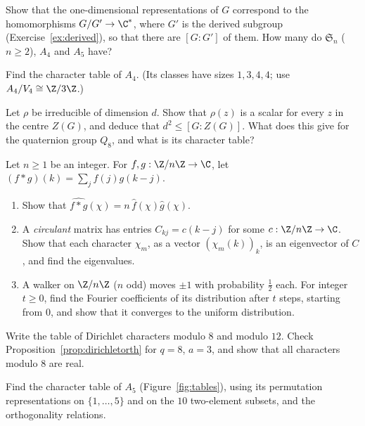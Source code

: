 \begin{exercise}[$\star$]\label{ex:onedim}
Show that the one-dimensional representations of $G$ correspond to the homomorphisms $G/G'\to\C^*$, where $G'$ is the derived subgroup (Exercise~\ref{ex:derived}), so that there are $[G:G']$ of them. How many do $\mathfrak S_n$ ($n\ge2$), $A_4$ and $A_5$ have?
\end{exercise}

\begin{exercise}[$\star\star$]\label{ex:a4}
Find the character table of $A_4$. (Its classes have sizes $1,3,4,4$; use $A_4/V_4\cong\Z/3\Z$.)
\end{exercise}

\begin{exercise}[$\star\star$]\label{ex:centralchar}
Let $\rho$ be irreducible of dimension $d$. Show that $\rho(z)$ is a scalar for every $z$ in the centre $Z(G)$, and deduce that $d^2\le[G:Z(G)]$. What does this give for the quaternion group $Q_8$, and what is its character table?
\end{exercise}

\begin{exercise}[$\star\star$]\label{ex:circulant}
Let $n\ge1$ be an integer. For $f,g:\Z/n\Z\to\C$, let $(f*g)(k)=\sum_jf(j)g(k-j)$.
\begin{enumerate}[label=(\alph*)]
\item Show that $\widehat{f*g}(\chi)=n\,\hat f(\chi)\hat g(\chi)$.
\item A \emph{circulant} matrix has entries $C_{kj}=c(k-j)$ for some $c:\Z/n\Z\to\C$. Show that each character $\chi_m$, as a vector $(\chi_m(k))_k$, is an eigenvector of $C$, and find the eigenvalues.
\item A walker on $\Z/n\Z$ ($n$ odd) moves $\pm1$ with probability $\frac12$ each. For integer $t\ge0$, find the Fourier coefficients of its distribution after $t$ steps, starting from $0$, and show that it converges to the uniform distribution.
\end{enumerate}
\end{exercise}

\begin{exercise}[$\star\star$]\label{ex:dirichlet8}
Write the table of Dirichlet characters modulo $8$ and modulo $12$. Check Proposition~\ref{prop:dirichletorth} for $q=8$, $a=3$, and show that all characters modulo $8$ are real.
\end{exercise}

\begin{exercise}[$\star\star\star$]\label{ex:a5}
Find the character table of $A_5$ (Figure~\ref{fig:tables}), using its permutation representations on $\{1,\dots,5\}$ and on the $10$ two-element subsets, and the orthogonality relations.
\end{exercise}

